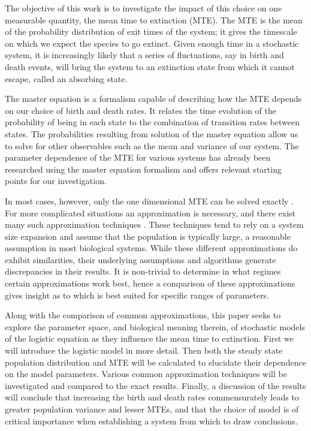 The objective of this work is to investigate the impact of this choice on one measurable quantity, the mean time to extinction (MTE).
The MTE is the mean of the probability distribution of exit times of the system; it gives the timescale on which we expect the species to go extinct.
Given enough time in a stochastic system, it is increasingly likely that a series of fluctuations, say in birth and death events, will bring the system to an extinction state from which it cannot escape, called an absorbing state. %

The master equation is a formalism capable of describing how the MTE depends on our choice of birth and death rates.
It relates the time evolution of the probability of being in each state to the combination of transition rates between states.
The probabilities resulting from solution of the master equation allow us to solve for other observables such as the mean and variance of our system.
The parameter dependence of the MTE for various systems has already been researched using the master equation formalism \cite{Nisbet1982} and offers relevant starting points for our investigation. 

In most cases, however, only the one dimensional MTE can be solved exactly \cite{Norden1982}.
For more complicated situations an approximation is necessary, and there exist many such approximation techniques \cite{Nisbet1982,Gardiner2004}.
These techniques tend to rely on a system size expansion and assume that the population is typically large, a reasonable assumption in most biological systems. 
While these different approximations do exhibit similarities, their underlying assumptions and algorithms generate discrepancies in their results. 
It is non-trivial to determine in what regimes certain approximations work best, hence a comparison of these approximations gives insight as to which is best suited for specific ranges of parameters. 

Along with the comparison of common approximations, this paper seeks to explore the parameter space, and biological meaning therein, of stochastic models of the logistic equation as they influence the mean time to extinction. 
First we will introduce the logistic model in more detail.
Then both the steady state population distribution and MTE will be calculated to elucidate their dependence on the model parameters. 
Various common approximation techniques will be investigated and compared to the exact results. 
Finally, a discussion of the results will conclude that increasing the birth and death rates commensurately leads to greater population variance and lesser MTEs, and that the choice of model is of critical importance when establishing a system from which to draw conclusions.

